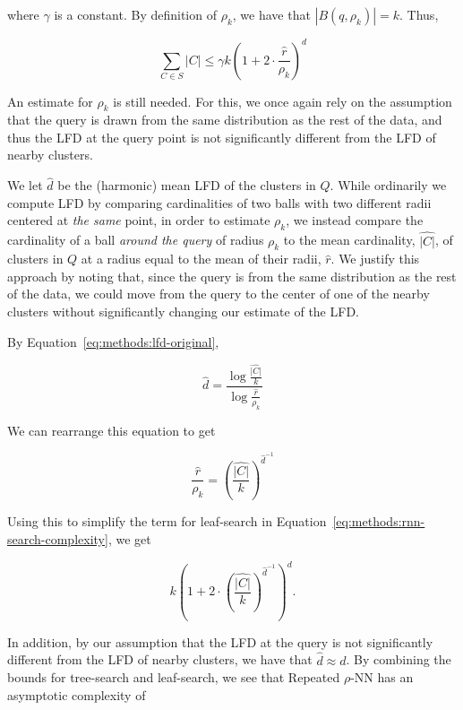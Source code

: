 where $\gamma$ is a constant. 
By definition of $\rho_k$, we have that $|B(q, \rho_k)| = k$.
Thus,

\begin{equation*}
    \sum_{C \in S} |C| \leq \gamma k \left( 1 + 2 \cdot \frac{\hat{r}}{\rho_k} \right)^d
\end{equation*}

An estimate for $\rho_k$ is still needed. 
For this, we once again rely on the assumption that the query is drawn from the same distribution as the rest of the data, and thus the LFD at the query point is not significantly different from the LFD of nearby clusters.

We let $\hat{d}$ be the (harmonic) mean LFD of the clusters in $Q$.
While ordinarily we compute LFD by comparing cardinalities of two balls with two different radii centered at \textit{the same} point, in order to estimate $\rho_k$, we instead compare the cardinality of a ball \textit{around the query} of radius $\rho_k$ to the mean cardinality, $\hat{|C|}$, of clusters in $Q$ at a radius equal to the mean of their radii, $\hat{r}$.
We justify this approach by noting that, since the query is from the same distribution as the rest of the data, we could move from the query to the center of one of the nearby clusters without significantly changing our estimate of the LFD.

By Equation~\ref{eq:methods:lfd-original},

\begin{equation*}
    \hat{d} = \frac{\log{}\frac{\hat{|C|}}{k}}{\log{}\frac{\hat{r}}{\rho_k}}
\end{equation*}

We can rearrange this equation to get

\begin{equation*}
    \frac{\hat{r}}{\rho_k} = \left( \frac{\hat{|C|}}{k} \right)^{\hat{d}^{-1}}
\end{equation*}

Using this to simplify the term for leaf-search in Equation~\ref{eq:methods:rnn-search-complexity}, we get

\begin{equation*}
    k \left( 1 + 2 \cdot \left( \frac{\hat{|C|}}{k} \right) ^ {\hat{d}^{-1}} \right)^d.
\end{equation*}

In addition, by our assumption that the LFD at the query is not significantly different from the LFD of nearby clusters, we have that $\hat{d} \approx d$.
By combining the bounds for tree-search and leaf-search, we see that Repeated $\rho$-NN has an asymptotic complexity of

